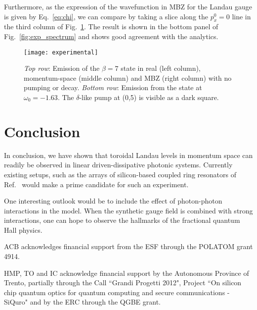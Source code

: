 \documentclass[twocolumn, 10pt, aps, superscriptaddress, floatfix, showpacs, prb, citeautoscript]{revtex4-1}
\newcommand{\co}[2]{#2}
\renewcommand{\paragraph}{\co}
\begin{document}
Furthermore, as the expression of the wavefunction in MBZ for the
Landau gauge is given by Eq.~\eqref{eq:chi}, we can compare by taking
a slice along the $p_x^0 = 0$ line in the third column of
Fig.~\ref{fig:exp_states}. The result is shown in the bottom panel of
Fig.~\ref{fig:exp_spectrum} and shows good agreement with the
analytics.



\begin{figure}[htb]
  \centering
  \texttt{[image: experimental]}
  \caption{\emph{Top row}: Emission of the $\beta=7$ state in real
    (left column), momentum-space (middle column) and MBZ (right
    column) with no pumping or decay.
    \emph{Bottom row}: Emission from the state at $\omega_0 = -1.63$.
    The $\delta$-like pump at (0,5) is visible as a dark square.}
  \label{fig:exp_states}
\end{figure}

\section{Conclusion}
\label{sec:conclusion}


In conclusion, we have shown that toroidal Landau levels in momentum
space can readily be observed in linear driven-dissipative photonic
systems. Currently existing setups, such as the arrays of
silicon-based coupled ring resonators of
Ref.~ would make a prime candidate for
such an experiment.

\paragraph{One possible outlook is to include interactions.}
One interesting outlook would be to include the effect of photon-photon interactions in the model. When the synthetic gauge field is combined with strong interactions, one can hope to observe the hallmarks of the fractional quantum Hall physics.


\acknowledgments

ACB acknowledges financial support from the ESF through the POLATOM grant 4914.

HMP, TO and IC acknowledge financial support by the Autonomous Province of Trento, partially through the Call ``Grandi Progetti 2012", Project ``On silicon chip quantum optics for quantum computing and secure communications - SiQuro" and by the ERC through the QGBE grant.
\end{document}
